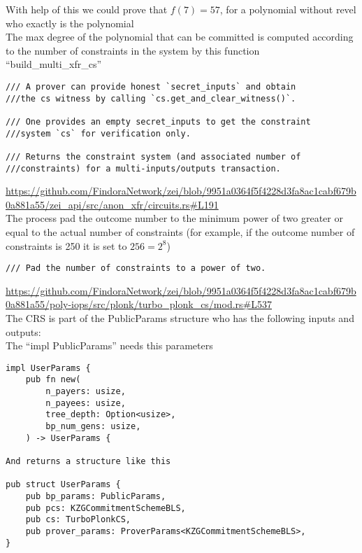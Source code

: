 \documentclass{article}
\begin{document}
With help of this we could prove that $f(7) = 57$, for a polynomial without revel who exactly is the polynomial\\


The max degree of the polynomial that can be committed is computed according to the number of constraints in the system by this function “build\_multi\_xfr\_cs”\\

\begin{verbatim}
/// A prover can provide honest `secret_inputs` and obtain
///the cs witness by calling `cs.get_and_clear_witness()`.

/// One provides an empty secret_inputs to get the constraint 
///system `cs` for verification only.

/// Returns the constraint system (and associated number of 
///constraints) for a multi-inputs/outputs transaction.

\end{verbatim}

\url{https://github.com/FindoraNetwork/zei/blob/9951a0364f5f4228d3fa8ac1cabf679b0a881a55/zei_api/src/anon_xfr/circuits.rs#L191}\\

The process pad the outcome number to the minimum power of two  greater or equal to the actual number of constraints (for example, if the outcome number of constraints is 250 it is set to $256 = 2^8$)\\

\begin{verbatim}
/// Pad the number of constraints to a power of two.
\end{verbatim}

\url{https://github.com/FindoraNetwork/zei/blob/9951a0364f5f4228d3fa8ac1cabf679b0a881a55/poly-iops/src/plonk/turbo_plonk_cs/mod.rs#L537}\\


The CRS is part of the PublicParams structure who has the following inputs and outputs:\\

The “impl PublicParams” needs this parameters\\

\begin{verbatim}
impl UserParams {
    pub fn new(
        n_payers: usize,
        n_payees: usize,
        tree_depth: Option<usize>,
        bp_num_gens: usize,
    ) -> UserParams {

And returns a structure like this  

pub struct UserParams {
    pub bp_params: PublicParams,
    pub pcs: KZGCommitmentSchemeBLS,
    pub cs: TurboPlonkCS,
    pub prover_params: ProverParams<KZGCommitmentSchemeBLS>,
}
\end{verbatim}
\end{document}

